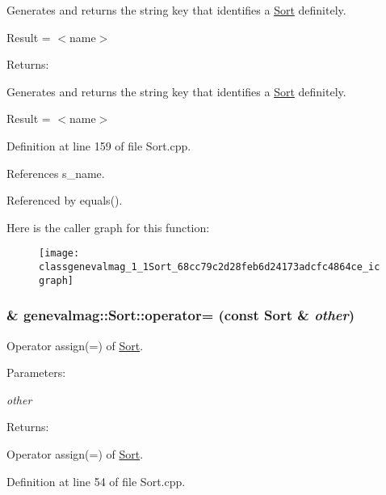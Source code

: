 Generates and returns the string key that identifies a \hyperlink{classgenevalmag_1_1Sort}{Sort} definitely.\par
 \par
 Result = $<$name$>$\par


\begin{Desc}
\item[Returns:]\end{Desc}
Generates and returns the string key that identifies a \hyperlink{classgenevalmag_1_1Sort}{Sort} definitely.

Result = $<$name$>$ 

Definition at line 159 of file Sort.cpp.

References s\_\-name.

Referenced by equals().

Here is the caller graph for this function:\nopagebreak
\begin{figure}[H]
\begin{center}
\leavevmode
\texttt{[image: classgenevalmag\_1\_1Sort\_68cc79c2d28feb6d24173adcfc4864ce\_icgraph]}
\end{center}
\end{figure}
\hypertarget{classgenevalmag_1_1Sort_c04dccc91f8c8bec5af9b86f9f3c7b7a}{
\subsubsection[{operator=}]{ \& genevalmag::Sort::operator= (const {\bf Sort} \& {\em other})}}
\label{classgenevalmag_1_1Sort_c04dccc91f8c8bec5af9b86f9f3c7b7a}


Operator assign(=) of \hyperlink{classgenevalmag_1_1Sort}{Sort}. \begin{Desc}
\item[Parameters:]
\begin{description}
\item[{\em other}]\end{description}
\end{Desc}
\begin{Desc}
\item[Returns:]\end{Desc}
Operator assign(=) of \hyperlink{classgenevalmag_1_1Sort}{Sort}. 

Definition at line 54 of file Sort.cpp.

